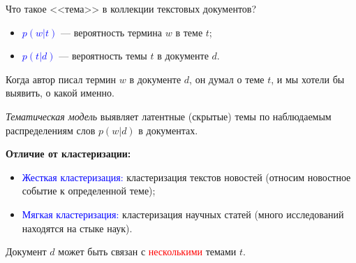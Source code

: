 \documentclass[unicode,9pt, pdf]{beamer}
\begin{document}
    \begin{frame}{Что такое <<тема>> в коллекции текстовых документов?}
    
     \begin{itemize}
         \item 
         \textcolor{blue}{$p(w|t)$} --- вероятность термина $w$ в теме $t$;
         \vspace{0.4 cm}
         \item  \textcolor{blue}{$p(t|d)$} --- вероятность темы $t$ в документе $d$.
     \end{itemize}
     
     \vspace{0.4 cm}
     
    Когда автор писал термин $w$ в документе $d$, он думал о теме $t$, и мы хотели бы выявить, о какой именно.
    
    \vspace{0.4 cm}
    \textit{Тематическая модель} выявляет латентные (скрытые) темы по наблюдаемым распределениям слов $p(w|d)$ в документах.
     
     \vspace{0.4 cm}
     
     \textbf{Отличие от кластеризации:}
     \begin{itemize}
         \item \textcolor{blue}{Жесткая кластеризация:} кластеризация текстов новостей (относим новостное событие к определенной теме);
         \item \textcolor{blue}{Мягкая кластеризация:} кластеризация научных статей (много исследований находятся на стыке наук).
     \end{itemize}
     Документ $d$ может быть связан с \textcolor{red}{несколькими} темами $t$.
    \end{frame}
    
 
   
\end{document}
